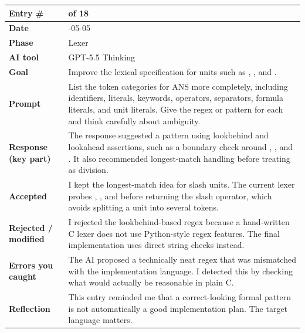 \documentclass[11pt,a4paper]{article}
\newcommand{\code}[1]{\texttt{\detokenize{#1}}}
\newcommand{\entrygap}{\vspace{8pt}}
\newenvironment{journalentry}{%
  \begin{center}\small\renewcommand{\arraystretch}{1.22}%
  \begin{tabular}{|>{\columncolor{anscodebg}\bfseries}p{3.0cm}|>{\RaggedRight\arraybackslash}p{12.25cm}|}%
  \hline
}{%
  \end{tabular}\end{center}\entrygap
}
\begin{document}
\begin{journalentry}
Entry \# & 4 of 18 \\ \hline
Date & 2026-05-05 \\ \hline
Phase & Lexer \\ \hline
AI tool & GPT-5.5 Thinking \\ \hline
Goal & Improve the lexical specification for units such as \code{g/mol}, \code{kg/mol}, and \code{kJ/mol}. \\ \hline
Prompt & List the token categories for ANS more completely, including identifiers, literals, keywords, operators, separators, formula literals, and unit literals. Give the regex or pattern for each and think carefully about ambiguity. \\ \hline
Response (key part) & The response suggested a \code{UNIT\_LITERAL} pattern using lookbehind and lookahead assertions, such as a boundary check around \code{kg/mol}, \code{g/mol}, and \code{kJ/mol}. It also recommended longest-match handling before treating \code{/} as division. \\ \hline
Accepted & I kept the longest-match idea for slash units. The current lexer probes \code{g/mol}, \code{kg/mol}, and \code{kJ/mol} before returning the slash operator, which avoids splitting a unit into several tokens. \\ \hline
Rejected / modified & I rejected the lookbehind-based regex because a hand-written C lexer does not use Python-style regex features. The final implementation uses direct string checks instead. \\ \hline
Errors you caught & The AI proposed a technically neat regex that was mismatched with the implementation language. I detected this by checking what would actually be reasonable in plain C. \\ \hline
Reflection & This entry reminded me that a correct-looking formal pattern is not automatically a good implementation plan. The target language matters. \\ \hline
\end{journalentry}
\end{document}
